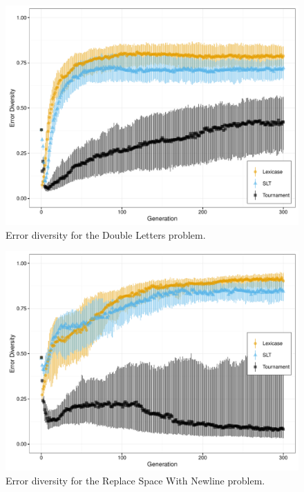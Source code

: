 \documentclass{sig-alternate}
\begin{document}
\begin{figure}[t] %
\centering
\includegraphics[width=\linewidth]{double-letters-div.pdf}
\caption{Error diversity for the Double Letters problem.}
\label{fig:dl-div}
\end{figure}

\begin{figure}[t] %
\centering
\includegraphics[width=\linewidth]{rswn-div.pdf}
\caption{Error diversity for the Replace Space With Newline problem.}
\label{fig:rswn-div}
\end{figure}
\end{document}
